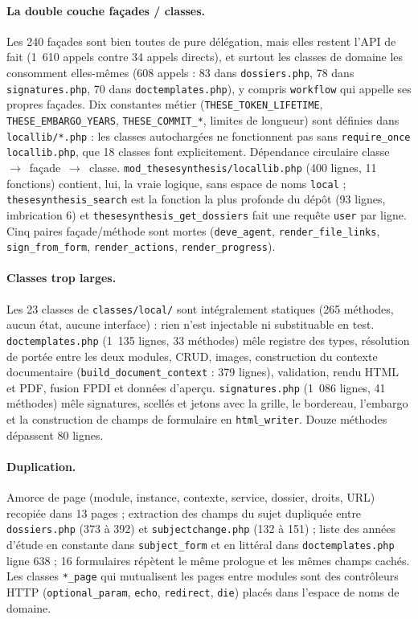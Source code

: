 \documentclass[11pt,a4paper]{article}
\newcommand{\fichier}[1]{\texttt{\small #1}}
\newcommand{\code}[1]{\texttt{#1}}
\begin{document}
\paragraph{La double couche façades / classes.}
Les 240 façades sont bien toutes de pure délégation, mais elles restent l'API de fait
(1~610 appels contre 34 appels directs), et surtout les classes de domaine les consomment
elles-mêmes (608 appels : 83 dans \fichier{dossiers.php}, 78 dans \fichier{signatures.php},
70 dans \fichier{doctemplates.php}), y compris \code{workflow} qui appelle ses propres façades.
Dix constantes métier (\code{THESE\_TOKEN\_LIFETIME}, \code{THESE\_EMBARGO\_YEARS},
\code{THESE\_COMMIT\_*}, limites de longueur) sont définies dans \fichier{locallib/*.php} : les
classes autochargées ne fonctionnent pas sans \code{require\_once locallib.php}, que 18 classes
font explicitement. Dépendance circulaire classe~$\rightarrow$~façade~$\rightarrow$~classe.
\code{mod\_thesesynthesis/locallib.php} (400 lignes, 11 fonctions) contient, lui, la vraie
logique, sans espace de noms \code{local} ; \code{thesesynthesis\_search} est la fonction la plus
profonde du dépôt (93 lignes, imbrication 6) et \code{thesesynthesis\_get\_dossiers} fait une
requête \code{user} par ligne. Cinq paires façade/méthode sont mortes (\code{deve\_agent},
\code{render\_file\_links}, \code{sign\_from\_form}, \code{render\_actions},
\code{render\_progress}).

\paragraph{Classes trop larges.}
Les 23 classes de \fichier{classes/local/} sont intégralement statiques (265 méthodes, aucun
état, aucune interface) : rien n'est injectable ni substituable en test.
\fichier{doctemplates.php} (1~135 lignes, 33 méthodes) mêle registre des types, résolution de
portée entre les deux modules, CRUD, images, construction du contexte documentaire
(\code{build\_document\_context} : 379 lignes), validation, rendu HTML et PDF, fusion FPDI et
données d'aperçu. \fichier{signatures.php} (1~086 lignes, 41 méthodes) mêle signatures, scellés
et jetons avec la grille, le bordereau, l'embargo et la construction de champs de formulaire en
\code{html\_writer}. Douze méthodes dépassent 80 lignes.

\paragraph{Duplication.}
Amorce de page (module, instance, contexte, service, dossier, droits, URL) recopiée dans
13 pages ; extraction des champs du sujet dupliquée entre \fichier{dossiers.php} (373 à 392) et
\fichier{subjectchange.php} (132 à 151) ; liste des années d'étude en constante dans
\code{subject\_form} et en littéral dans \fichier{doctemplates.php} ligne 638 ; 16 formulaires
répètent le même prologue et les mêmes champs cachés. Les classes \code{*\_page} qui mutualisent
les pages entre modules sont des contrôleurs HTTP (\code{optional\_param}, \code{echo},
\code{redirect}, \code{die}) placés dans l'espace de noms de domaine.
\end{document}
